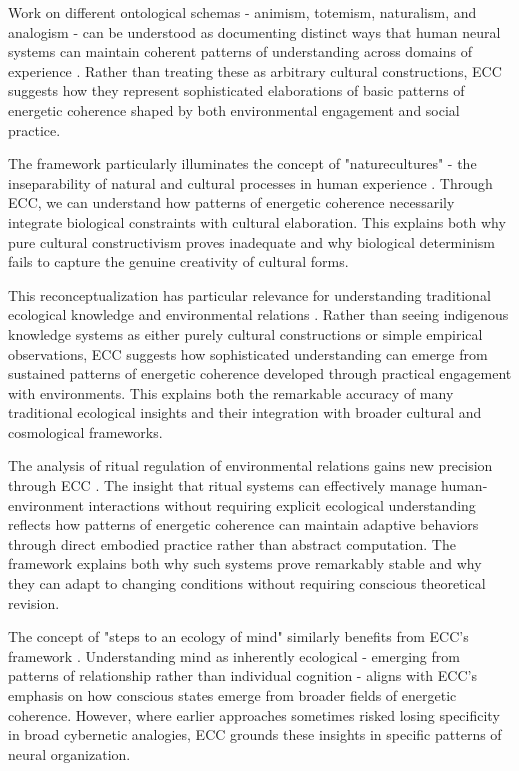 Work on different ontological schemas - animism, totemism, naturalism, and analogism - can be understood as documenting distinct ways that human neural systems can maintain coherent patterns of understanding across domains of experience \cite{descola2005beyond}. Rather than treating these as arbitrary cultural constructions, ECC suggests how they represent sophisticated elaborations of basic patterns of energetic coherence shaped by both environmental engagement and social practice.

The framework particularly illuminates the concept of "naturecultures" - the inseparability of natural and cultural processes in human experience \cite{haraway2003companion}. Through ECC, we can understand how patterns of energetic coherence necessarily integrate biological constraints with cultural elaboration. This explains both why pure cultural constructivism proves inadequate and why biological determinism fails to capture the genuine creativity of cultural forms.

This reconceptualization has particular relevance for understanding traditional ecological knowledge and environmental relations \cite{ingold2000perception}. Rather than seeing indigenous knowledge systems as either purely cultural constructions or simple empirical observations, ECC suggests how sophisticated understanding can emerge from sustained patterns of energetic coherence developed through practical engagement with environments. This explains both the remarkable accuracy of many traditional ecological insights and their integration with broader cultural and cosmological frameworks.

The analysis of ritual regulation of environmental relations gains new precision through ECC \cite{rappaport1999ritual}. The insight that ritual systems can effectively manage human-environment interactions without requiring explicit ecological understanding reflects how patterns of energetic coherence can maintain adaptive behaviors through direct embodied practice rather than abstract computation. The framework explains both why such systems prove remarkably stable and why they can adapt to changing conditions without requiring conscious theoretical revision.

The concept of "steps to an ecology of mind" similarly benefits from ECC's framework \cite{bateson1972steps}. Understanding mind as inherently ecological - emerging from patterns of relationship rather than individual cognition - aligns with ECC's emphasis on how conscious states emerge from broader fields of energetic coherence. However, where earlier approaches sometimes risked losing specificity in broad cybernetic analogies, ECC grounds these insights in specific patterns of neural organization.

